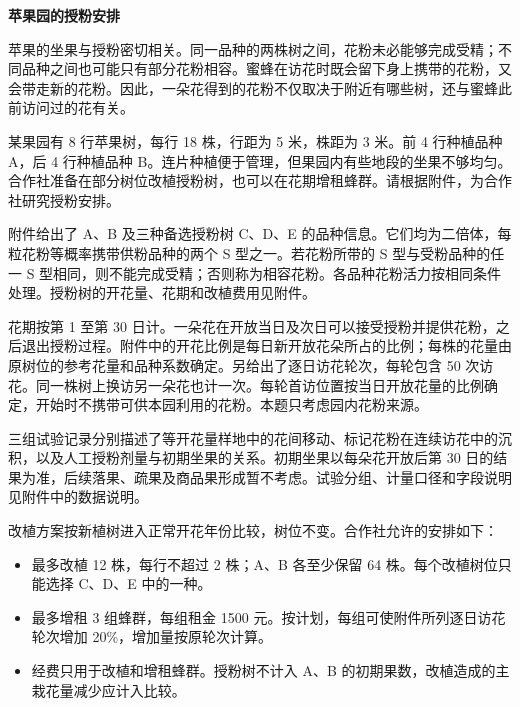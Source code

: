 \documentclass[11pt,a4paper]{article}
\begin{document}
\begin{center}{\LARGE\bfseries 苹果园的授粉安排}\end{center}

苹果的坐果与授粉密切相关。同一品种的两株树之间，花粉未必能够完成受精；不同品种之间也可能只有部分花粉相容。蜜蜂在访花时既会留下身上携带的花粉，又会带走新的花粉。因此，一朵花得到的花粉不仅取决于附近有哪些树，还与蜜蜂此前访问过的花有关。

某果园有 8 行苹果树，每行 18 株，行距为 5 米，株距为 3 米。前 4 行种植品种 A，后 4 行种植品种 B。连片种植便于管理，但果园内有些地段的坐果不够均匀。合作社准备在部分树位改植授粉树，也可以在花期增租蜂群。请根据附件，为合作社研究授粉安排。

附件给出了 A、B 及三种备选授粉树 C、D、E 的品种信息。它们均为二倍体，每粒花粉等概率携带供粉品种的两个 S 型之一。若花粉所带的 S 型与受粉品种的任一 S 型相同，则不能完成受精；否则称为相容花粉。各品种花粉活力按相同条件处理。授粉树的开花量、花期和改植费用见附件。

花期按第 1 至第 30 日计。一朵花在开放当日及次日可以接受授粉并提供花粉，之后退出授粉过程。附件中的开花比例是每日新开放花朵所占的比例；每株的花量由原树位的参考花量和品种系数确定。另给出了逐日访花轮次，每轮包含 50 次访花。同一株树上换访另一朵花也计一次。每轮首访位置按当日开放花量的比例确定，开始时不携带可供本园利用的花粉。本题只考虑园内花粉来源。

三组试验记录分别描述了等开花量样地中的花间移动、标记花粉在连续访花中的沉积，以及人工授粉剂量与初期坐果的关系。初期坐果以每朵花开放后第 30 日的结果为准，后续落果、疏果及商品果形成暂不考虑。试验分组、计量口径和字段说明见附件中的数据说明。

改植方案按新植树进入正常开花年份比较，树位不变。合作社允许的安排如下：
\begin{itemize}[leftmargin=2em,itemsep=3pt]
\item 最多改植 12 株，每行不超过 2 株；A、B 各至少保留 64 株。每个改植树位只能选择 C、D、E 中的一种。
\item 最多增租 3 组蜂群，每组租金 1500 元。按计划，每组可使附件所列逐日访花轮次增加 20\%，增加量按原轮次计算。
\item 经费只用于改植和增租蜂群。授粉树不计入 A、B 的初期果数，改植造成的主栽花量减少应计入比较。
\end{itemize}
\end{document}
